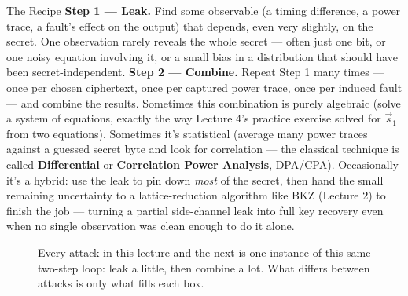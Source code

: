 \begin{rmkbox}{The Recipe}
\textbf{Step 1 --- Leak.} Find some observable (a timing difference, a power trace, a fault's effect on the output) that depends, even very slightly, on the secret. One observation rarely reveals the whole secret --- often just one bit, or one noisy equation involving it, or a small bias in a distribution that should have been secret-independent. \textbf{Step 2 --- Combine.} Repeat Step 1 many times --- once per chosen ciphertext, once per captured power trace, once per induced fault --- and combine the results. Sometimes this combination is purely algebraic (solve a system of equations, exactly the way Lecture 4's practice exercise solved for $\vec s_1$ from two equations). Sometimes it's statistical (average many power traces against a guessed secret byte and look for correlation --- the classical technique is called \textbf{Differential} or \textbf{Correlation Power Analysis}, DPA/CPA). Occasionally it's a hybrid: use the leak to pin down \emph{most} of the secret, then hand the small remaining uncertainty to a lattice-reduction algorithm like BKZ (Lecture 2) to finish the job --- turning a partial side-channel leak into full key recovery even when no single observation was clean enough to do it alone.
\end{rmkbox}

\begin{figure}[ht]
\centering
{}
\caption{Every attack in this lecture and the next is one instance of this same two-step loop: leak a little, then combine a lot. What differs between attacks is only what fills each box.}
\label{fig:attack-recipe}
\end{figure}

